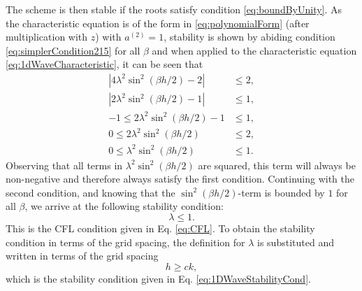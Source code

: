 {{%
The scheme is then stable if the roots satisfy condition \eqref{eq:boundByUnity}. As the characteristic equation is of the form in \eqref{eq:polynomialForm} (after multiplication with $z$) with $a^{(2)} = 1$, stability is shown by abiding condition 
\eqref{eq:simplerCondition215} for all $\beta$ and when applied to the characteristic equation \eqref{eq:1dWaveCharacteristic}, it can be seen that
\begin{equation}\nonumber
    \begin{aligned}
        |4\lambda^2\sin^2(\beta h/2) - 2| &\leq 2,\\
        |2\lambda^2\sin^2(\beta h/2) - 1| &\leq 1,\\
        -1 \leq 2\lambda^2\sin^2(\beta h/2) - 1 &\leq 1,\\
        0 \leq 2\lambda^2\sin^2(\beta h/2)&\leq 2,\\
        0\leq \lambda^2\sin^2(\beta h/2) &\leq 1.
    \end{aligned}
\end{equation}
Observing that all terms in $\lambda^2\sin^2(\beta h/2)$ are squared, this term will always be non-negative and therefore always satisfy the first condition. Continuing with the second condition, and knowing that the $\sin^2(\beta h / 2)$-term is bounded by $1$ for all $\beta$, we arrive at the following stability condition:
\begin{equation*}
    \lambda \leq 1.
\end{equation*}
This is the CFL condition given in Eq. \eqref{eq:CFL}. To obtain the stability condition in terms of the grid spacing, the definition for $\lambda$ is substituted and written in terms of the grid spacing
\begin{equation}
    h \geq ck,
\end{equation}
which is the stability condition given in Eq. \eqref{eq:1DWaveStabilityCond}.

}}
